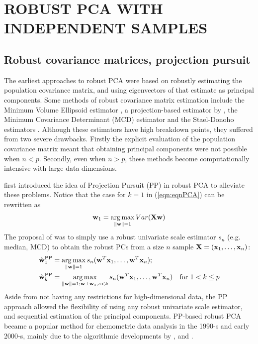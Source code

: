 \section*{\sffamily \Large ROBUST PCA WITH INDEPENDENT SAMPLES}
\label{Section:sec2}

\subsection*{\sffamily \large Robust covariance matrices, projection pursuit}

The earliest approaches to robust PCA were based on robustly estimating the population covariance matrix, and using eigenvectors of that estimate as principal components. Some methods of robust covariance matrix estimation include the Minimum Volume Ellipsoid estimator \citep{Rousseeuw84}, a projection-based estimator by \citep{maronna76}, the Minimum Covariance Determinant (MCD) estimator \citep{rousseeuw85} and the Stael-Donoho estimators \citep{MaronnaYohai95,ZuoCui05}. Although these estimators have high breakdown points, they suffered from two severe drawbacks. Firstly the explicit evaluation of the population covariance matrix meant that obtaining principal components were not possible when $n < p$. Secondly, even when $n > p$, these methods become computationally intensive with large data dimensions.

\cite{LiChen85} first introduced the idea of Projection Pursuit (PP) in robust PCA to alleviate these problems. Notice that the case for $k=1$ in (\ref{eqn:eqnPCA}) can be rewritten as
%
$$
{\bf{w}}_1 = \operatorname*{arg\,max}_{\| {\bf{w}} \| = 1} Var ({\mathbf{X}} {\bf{w}})
$$
%
The proposal of \cite{LiChen85} was to simply use a robust univariate scale estimator $s_n$ (e.g. median, MCD) to obtain the robust PCs from a size $n$ sample ${\mathbf{X}} = ({\bf{x}}_1, \ldots, {\bf{x}}_n)$:
%
\begin{align*}
\hat {{\bf{w}}}_1^\text{PP} &= \operatorname*{arg\,max}_{\| {\bf{w}} \| = 1} s_n ( {\bf{w}}^T {\bf{x}}_1, \ldots, {\bf{w}}^T {\bf{x}}_n );\\
\hat {{\bf{w}}}_k^\text{PP} &= \operatorname*{arg\,max}_{\| {\bf{w}} \| = 1; {\bf{w}} \perp {\bf{w}}_s, s < k} s_n ( {\bf{w}}^T {\bf{x}}_1, \ldots, {\bf{w}}^T {\bf{x}}_n ) \quad \text{for } 1< k \leq p
\end{align*}
%
Aside from not having any restrictions for high-dimensional data, the PP approach allowed the flexibility of using any robust univariate scale estimator, and sequential estimation of the principal components. PP-based robust PCA became a popular method for chemometric data analysis in the 1990-s and early 2000-s, mainly due to the algorithmic developments by \cite{XieEtal93}, \cite{HubertEtal02} and \cite{CrouxEtal07}.

